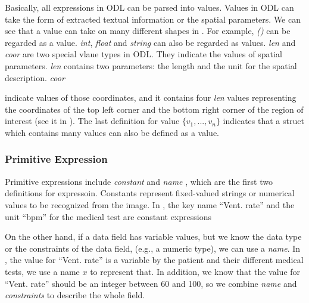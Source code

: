 Basically, all expressions in ODL can be parsed into values. Values 
in ODL can take the form of extracted textual information or the spatial parameters. 
	We can see that a value can take on many different shapes 
in . For example, {\em ()} can be regarded as a value.
{\em int}, 
{\em float} and {\em string} can also be regarded as values.
{\em len} and {\em coor} are two special vlaue types in ODL. They indicate 
the values of spatial parameters. {\em len} contains two parameters: the  
length and the unit for the spatial description. {\em coor} {indicate  values of those
coordinates, and it contains four {\em len} values representing 
the coordinates of the top left corner and the bottom right corner of 
the region of interest (see it in ). The last definition for value  {\em $\{v_1, ..., v_n\}$} indicates that a struct which contains many values can also be defined as a value. 

\subsubsection{Primitive Expression}
Primitive expressions include {\em constant} and {\em name} , which are the first two definitions for expressoin.
Constants represent fixed-valued strings or numerical values to be recognized from the 
image. In , the key name ``Vent. rate'' and the unit 
``bpm'' for the medical test are constant expressions 

On the other hand, if a data field has variable values,
but we know the data type or the constraints of the data field,
(e.g., a numeric type), we can use a {\em name}. 
In , the value for ``Vent. rate'' is a variable by
the patient and their different medical tests, we use a name $x$ to represent that. 
In addition, we know that the value for ``Vent. rate'' should be an integer 
between 60 and 100, so we combine {\em name} and {\em constraints} 
to describe the whole field. 

}
